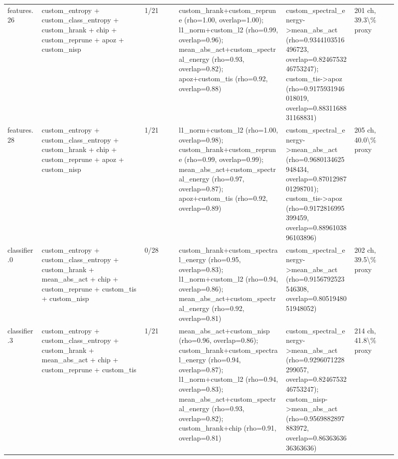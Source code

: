 \documentclass[10pt]{article}
\begin{document}
\begin{longtable}{p{0.08\linewidth}p{0.24\linewidth}p{0.08\linewidth}p{0.25\linewidth}p{0.16\linewidth}p{0.10\linewidth}}
features.26 & custom\_entropy + custom\_class\_entropy + custom\_hrank + chip + custom\_reprune + apoz + custom\_nisp & 1/21 & custom\_hrank+custom\_reprune (rho=1.00, overlap=1.00); l1\_norm+custom\_l2 (rho=0.99, overlap=0.96); mean\_abs\_act+custom\_spectral\_energy (rho=0.93, overlap=0.82); apoz+custom\_tis (rho=0.92, overlap=0.88) & custom\_spectral\_energy->mean\_abs\_act (rho=0.9344103516496723, overlap=0.8246753246753247); custom\_tis->apoz (rho=0.9175931946018019, overlap=0.8831168831168831) & 201 ch, 39.3\textbackslash{}\% proxy \\
features.28 & custom\_entropy + custom\_class\_entropy + custom\_hrank + chip + custom\_reprune + apoz + custom\_nisp & 1/21 & l1\_norm+custom\_l2 (rho=1.00, overlap=0.98); custom\_hrank+custom\_reprune (rho=0.99, overlap=0.99); mean\_abs\_act+custom\_spectral\_energy (rho=0.97, overlap=0.87); apoz+custom\_tis (rho=0.92, overlap=0.89) & custom\_spectral\_energy->mean\_abs\_act (rho=0.9680134625948434, overlap=0.8701298701298701); custom\_tis->apoz (rho=0.9172816995399459, overlap=0.8896103896103896) & 205 ch, 40.0\textbackslash{}\% proxy \\
classifier.0 & custom\_entropy + custom\_class\_entropy + custom\_hrank + mean\_abs\_act + chip + custom\_reprune + custom\_tis + custom\_nisp & 0/28 & custom\_hrank+custom\_spectral\_energy (rho=0.95, overlap=0.83); l1\_norm+custom\_l2 (rho=0.94, overlap=0.86); mean\_abs\_act+custom\_spectral\_energy (rho=0.92, overlap=0.81) & custom\_spectral\_energy->mean\_abs\_act (rho=0.9156792523546308, overlap=0.8051948051948052) & 202 ch, 39.5\textbackslash{}\% proxy \\
classifier.3 & custom\_entropy + custom\_class\_entropy + custom\_hrank + mean\_abs\_act + chip + custom\_reprune + custom\_tis & 1/21 & mean\_abs\_act+custom\_nisp (rho=0.96, overlap=0.86); custom\_hrank+custom\_spectral\_energy (rho=0.94, overlap=0.87); l1\_norm+custom\_l2 (rho=0.94, overlap=0.83); mean\_abs\_act+custom\_spectral\_energy (rho=0.93, overlap=0.82); custom\_hrank+chip (rho=0.91, overlap=0.81) & custom\_spectral\_energy->mean\_abs\_act (rho=0.9296071228299057, overlap=0.8246753246753247); custom\_nisp->mean\_abs\_act (rho=0.9569882897883972, overlap=0.8636363636363636) & 214 ch, 41.8\textbackslash{}\% proxy \\
\bottomrule
\end{longtable}
\normalsize
\end{document}
